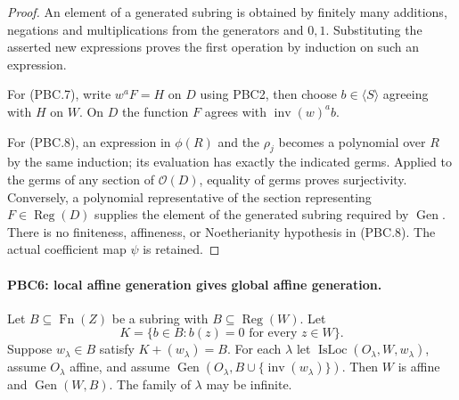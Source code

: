 \begin{proof}
An element of a generated subring is obtained by finitely many
additions, negations and multiplications from the generators and
$0,1$.  Substituting the asserted new expressions proves the first
operation by induction on such an expression.

For (PBC.7), write $w^aF=H$ on $D$ using PBC2, then choose
$b\in\langle S\rangle$ agreeing with $H$ on $W$.
On $D$ the function $F$ agrees with
$\operatorname{inv}(w)^a b$.

For (PBC.8), an expression in $\phi(R)$ and the $\rho_j$ becomes a
polynomial over $R$ by the same induction; its evaluation has exactly
the indicated germs.  Applied to the germs of any section of
$\mathcal O(D)$, equality of germs proves surjectivity.
Conversely, a polynomial representative of the section representing
$F\in\operatorname{Reg}(D)$ supplies the element of the generated
subring required by $\operatorname{Gen}$.  There is no finiteness,
affineness, or Noetherianity hypothesis in (PBC.8).  The actual
coefficient map $\psi$ is retained.
\end{proof}

\paragraph{PBC6: local affine generation gives global affine generation.}
\label{claim:PBC6}
Let $B\subseteq\operatorname{Fn}(Z)$ be a subring with
$B\subseteq\operatorname{Reg}(W)$.  Let
\[
 K=\{b\in B:b(z)=0\text{ for every }z\in W\}.
                                                        \tag{PBC.9}
\]
Suppose $w_\lambda\in B$ satisfy $K+(w_\lambda)=B$.
For each $\lambda$ let
$\operatorname{IsLoc}(O_\lambda,W,w_\lambda)$, assume
$O_\lambda$ affine, and assume
$\operatorname{Gen}(O_\lambda,B\cup\{\operatorname{inv}(w_\lambda)\})$.
Then $W$ is affine and $\operatorname{Gen}(W,B)$.
The family of $\lambda$ may be infinite.

